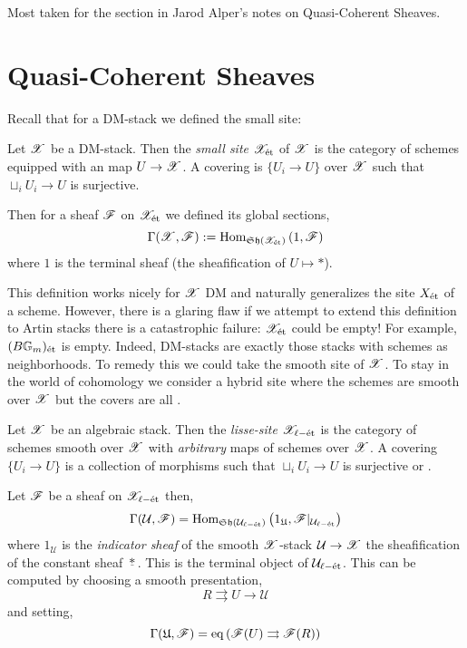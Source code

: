 \documentclass[12pt]{article}
\begin{document}
Most taken for the section in Jarod Alper's notes on Quasi-Coherent Sheaves.

\section{Quasi-Coherent Sheaves}

Recall that for a DM-stack we defined the small \etale site:

\begin{defn}
Let $\mathscr{X}$ be a DM-stack. Then the \textit{small \etale site} $\mathscr{X}_{\text{\'{e}t}}$ of $\mathscr{X}$ is the category of schemes equipped with an \etale map $U \to \mathscr{X}$. A covering is $\{ U_i \to U \}$ over $\mathscr{X}$ such that $\sqcup_i U_i \to U$ is surjective.
\end{defn}

Then for a sheaf $\mathscr{F}$ on $\mathscr{X}_{\text{\'{e}t}}$ we defined its global sections,
\[ \Gamma(\mathscr{X}, \mathscr{F}) := \mathrm{Hom}_{\mathfrak{Sh}(\mathscr{X}_{\text{\'{e}t}})} \left( 1, \mathscr{F} \right) \]
where $1$ is the terminal sheaf (the sheafification of $U \mapsto *$). 

\begin{rmk}
This definition works nicely for $\mathscr{X}$ DM and naturally generalizes the \etale site $X_{\text{\'{e}t}}$ of a scheme. However, there is a glaring flaw if we attempt to extend this definition to Artin stacks there is a catastrophic failure: $\mathscr{X}_{\text{\'{e}t}}$ could be empty! For example, $(B \mathbb{G}_m)_{\text{\'{e}t}}$ is empty. Indeed, DM-stacks are exactly those stacks with schemes as \etale neighborhoods. To remedy this we could take the smooth site of $\mathscr{X}$. To stay in the world of \etale cohomology we consider a hybrid site where the schemes are smooth over $\mathscr{X}$ but the covers are all \etale.
\end{rmk}

\newcommand{\lisset}{\ell-\et}
\newcommand{\Y}{\mathcal{Y}}
\newcommand{\Zar}{\mathrm{Zar}}
\newcommand{\B}{\mathbf{B}}
\newcommand{\fU}{\mathfrak{U}}
\renewcommand{\QCoh}{\mathrm{QCoh}}
\newcommand{\DD}{\mathrm{DD}}
\newcommand{\cU}{\mathcal{U}}


\begin{defn}
Let $\mathscr{X}$ be an algebraic stack. Then the \textit{lisse-\etale site} $\X_{\lisset}$ is the category of schemes smooth over $\mathscr{X}$ with \textit{arbitrary} maps of schemes over $\mathscr{X}$. A covering $\{ U_i \to U \}$ is a collection of morphisms such that $\sqcup_i U_i \to U$ is surjective or \etale.
\end{defn}

\begin{defn}
Let $\mathscr{F}$ be a sheaf on $\X_{\lisset}$ then,
\[ \Gamma(\cU, \F) = \Hom{\Sh(\cU_{\lisset})}{1_{\fU}}{\F|_{\cU_{\lisset}}} \]
where $1_{\cU}$ is the \textit{indicator sheaf} of the smooth $\mathscr{X}$-stack $\cU \to \X$ the sheafification of the constant sheaf $\underline{*}$. This is the terminal object of $\cU_{\lisset}$.
This can be computed by choosing a smooth presentation,
\[ R \rightrightarrows U \to \cU \]
and setting,
\[ \Gamma(\fU, \F) = \eq \left( \F(U) \rightrightarrows \F(R) \right) \] 
\end{defn}
\end{document}
